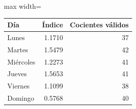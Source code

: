 \begin{center}\small\setlength{\tabcolsep}{4pt}
\begin{adjustbox}{max width=\textwidth}\begin{tabular}{lrr}
\toprule
Día & Índice & Cocientes válidos \\ \midrule
Lunes & 1.1710 & 37 \\
Martes & 1.5479 & 42 \\
Miércoles & 1.2273 & 41 \\
Jueves & 1.5653 & 41 \\
Viernes & 1.1099 & 38 \\
Domingo & 0.5768 & 40 \\
\bottomrule\end{tabular}\end{adjustbox}\end{center}

